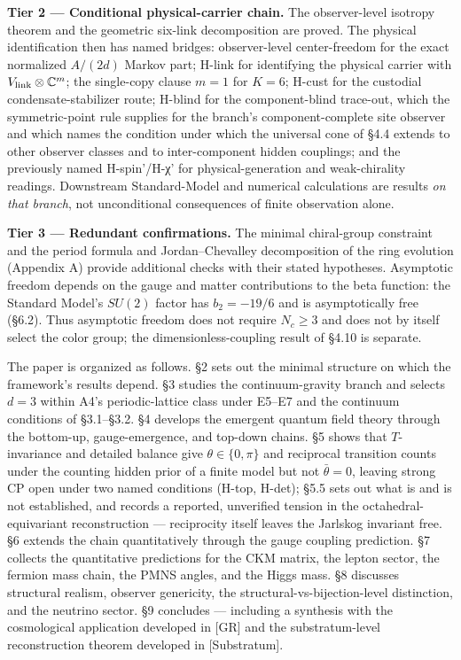 \documentclass[
]{article}
\begin{document}
\textbf{Tier 2 --- Conditional physical-carrier chain.} The
observer-level isotropy theorem and the geometric six-link decomposition
are proved. The physical identification then has named bridges:
observer-level center-freedom for the exact normalized \(A/(2d)\) Markov
part; H-link for identifying the physical carrier with
\(V_{\rm link}\otimes\mathbb C^m\); the single-copy clause \(m=1\) for
\(K=6\); H-cust for the custodial condensate-stabilizer route; H-blind
for the component-blind trace-out, which the symmetric-point rule
supplies for the branch's component-complete site observer and which
names the condition under which the universal cone of §4.4 extends to
other observer classes and to inter-component hidden couplings; and the
previously named H-spin'/H-χ' for physical-generation and weak-chirality
readings. Downstream Standard-Model and numerical calculations are
results \emph{on that branch}, not unconditional consequences of finite
observation alone.

\textbf{Tier 3 --- Redundant confirmations.} The minimal chiral-group
constraint and the period formula and Jordan--Chevalley decomposition of
the ring evolution (Appendix A) provide additional checks with their
stated hypotheses. Asymptotic freedom depends on the gauge and matter
contributions to the beta function: the Standard Model's \(SU(2)\)
factor has \(b_2=-19/6\) and is asymptotically free (§6.2). Thus
asymptotic freedom does not require \(N_c\geq3\) and does not by itself
select the color group; the dimensionless-coupling result of §4.10 is
separate.

The paper is organized as follows. §2 sets out the minimal structure on
which the framework's results depend. §3 studies the continuum-gravity
branch and selects \(d = 3\) within A4's periodic-lattice class under
E5--E7 and the continuum conditions of §3.1--§3.2. §4 develops the
emergent quantum field theory through the bottom-up, gauge-emergence,
and top-down chains. §5 shows that \(T\)-invariance and detailed balance
give \(\theta\in\{0,\pi\}\) and reciprocal transition counts under the
counting hidden prior of a finite model but not \(\bar\theta = 0\),
leaving strong CP open under two named conditions (H-top, H-det); §5.5
sets out what is and is not established, and records a reported,
unverified tension in the octahedral-equivariant reconstruction ---
reciprocity itself leaves the Jarlskog invariant free. §6 extends the
chain quantitatively through the gauge coupling prediction. §7 collects
the quantitative predictions for the CKM matrix, the lepton sector, the
fermion mass chain, the PMNS angles, and the Higgs mass. §8 discusses
structural realism, observer genericity, the
structural-vs-bijection-level distinction, and the neutrino sector. §9
concludes --- including a synthesis with the cosmological application
developed in {[}GR{]} and the substratum-level reconstruction theorem
developed in {[}Substratum{]}.
\end{document}
